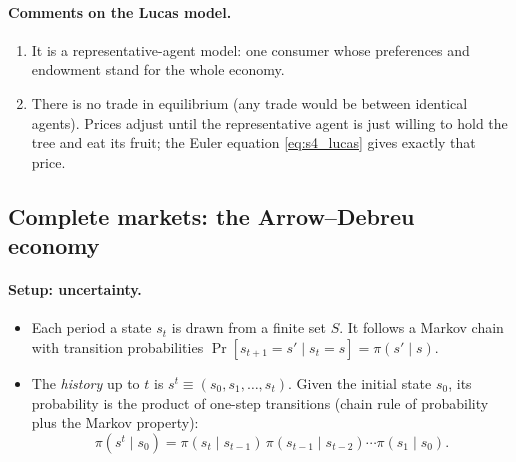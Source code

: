 \paragraph{Comments on the Lucas model.}
\begin{enumerate}
  \item It is a representative-agent model: one consumer whose preferences and endowment stand for the whole economy.
  \item There is no trade in equilibrium (any trade would be between identical agents). Prices adjust until the representative agent is just willing to hold the tree and eat its fruit; the Euler equation \eqref{eq:s4_lucas} gives exactly that price.
\end{enumerate}

\subsection{Complete markets: the Arrow--Debreu economy }

\paragraph{Setup: uncertainty.}
\begin{itemize}
  \item Each period a state $s_t$ is drawn from a finite set $S$. It follows a Markov chain with transition probabilities $\Pr[s_{t+1}=s'\mid s_t=s]=\pi(s'\mid s)$.
  \item The \emph{history} up to $t$ is $s^t\equiv(s_0,s_1,\dots,s_t)$. Given the initial state $s_0$, its probability is the product of one-step transitions (chain rule of probability plus the Markov property):
  \begin{equation}\label{eq:s4_hist}
    \pi(s^t\mid s_0) = \pi(s_t\mid s_{t-1})\,\pi(s_{t-1}\mid s_{t-2})\cdots\pi(s_1\mid s_0).
  \end{equation}
\end{itemize}

